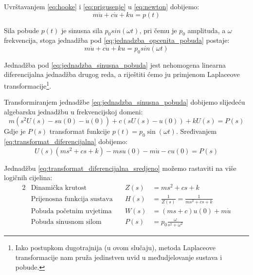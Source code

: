 Uvrštavanjem \eqref{eq:hooke} i \eqref{eq:prigusenje} u \eqref{eq:newton} dobijemo:
\begin{equation}
	m\ddot{u} + c\dot{u} + ku = p(t) \label{eq:jednadzba_opcenita_pobuda}
\end{equation}

Sila pobude $p(t)$ je sinusna sila $p_0sin(\omega t)$, pri čemu je $p_0$ amplituda, a
$\omega$ frekvencija, stoga jednadžba pod \eqref{eq:jednadzba_opcenita_pobuda}
postaje:
\begin{equation}
	m\ddot{u} + c\dot{u} + ku = p_0sin(\omega t)
\label{eq:jednadzba_sinusna_pobuda}
\end{equation} 


Jednadžba pod \eqref{eq:jednadzba_sinusna_pobuda} jest nehomogena linearna
diferencijalna jednadžba drugog reda, a riještiti ćemo ju primjenom Laplaceove
transformacije\footnote{Iako postupkom dugotrajnija (u ovom
slučaju), metoda Laplaceove transformacije nam pruža jedinstven uvid u međudjelovanje sustava
i pobude.}.
\par

Transformiranjem jednadžbe \eqref{eq:jednadzba_sinusna_pobuda} dobijemo 
slijedeću algebarsku jednadžbu u frekvencijskoj domeni:
\begin{equation}\label{eq:transformat_diferencijalna}
        m(s^2U(s)-su(0)-\dot{u}(0))+
	c(sU(s)-u(0))+
	kU(s) = 
        P(s)
\end{equation}
Gdje je $P(s)$ transformat funkcije $p(t)=p_0\sin(\omega t)$.
Sređivanjem \eqref{eq:transformat_diferencijalna} dobijemo: 
\begin{equation}\label{eq:transformat_diferencijalna_sredjeno}
    U(s)\left(ms^2+cs+k\right)-msu(0)-m\dot{u}-cu(0) = P(s)
\end{equation}

Jednadžbu \eqref{eq:transformat_diferencijalna_sredjeno} možemo rastaviti na više logičnih
cijelina:
\begin{alignat}{2}
    &\text{Dinamička krutost} & Z(s)&=ms^2+cs+k\label{eq:din_krutost}\\
    &\text{Prijenosna funkcija sustava}\quad & H(s)&=\frac{1}{Z(s)}=\frac{1}{ms^2+cs+k}\label{eq:prijenosna}\\
    &\text{Pobuda početnim uvjetima}\quad & W(s)&=(ms+c)u(0)+m\dot{u}\label{eq:pobuda_pocetni}\\
    &\text{Pobuda sinusnom silom} & P(s)&=p_0\frac{\omega}{s^2+\omega^2}\label{eq:pobuda_sinusna}
\end{alignat}

